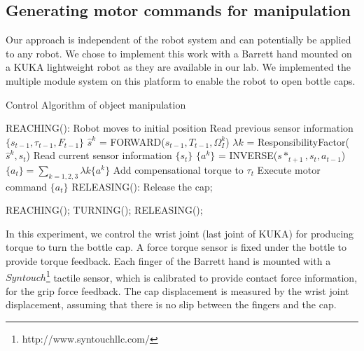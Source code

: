 \subsection{Generating motor commands for manipulation}
\label{cha4:sec3:command}
Our approach is independent of the robot system and can potentially be applied to any robot. We chose to implement this work with a Barrett hand mounted on a KUKA lightweight robot as they are available in our lab. We implemented the multiple module system on this platform to enable the robot to open bottle caps.

\begin{algorithm}[ht!]
  \caption{Control Algorithm of object manipulation}
  \begin{algorithmic}[1]
    \State REACHING(): Robot moves to initial position\;
          \State Read previous sensor information $\{s_{t-1},\tau_{t-1},F_{t-1}\}$\;
            \State $\hat{s}^{k}$ = FORWARD($s_{t-1},T_{t-1},\Omega_I^k$) \;
          \EndFor
            \State $\lambda{k}$ = ResponsibilityFactor($\hat{s}^{k},s_t$) \;
          \EndFor
          \State Read current sensor information $\{s_{t}\}$\;
            \State $\{a^k\}$ = INVERSE($s*_{t+1},s_t,a_{t-1}$) \;
          \EndFor
          \State $\{a_t\} = \sum_{k=1,2,3}\lambda{k}\{a^k\}$\;\;
          \State Add compensational torque to $\tau_t$\;
          \State Execute motor command $\{a_t\}$ \;
          \State RELEASING(): Release the cap;
        \EndFunction
    \EndFor

        \State REACHING();
        \State TURNING();
        \State RELEASING();
    \EndWhile

  \end{algorithmic}
  \label{code:control}
\end{algorithm}


In this experiment, we control the wrist joint (last joint of KUKA) for producing torque to turn the bottle cap. A force torque sensor is fixed under the bottle to provide torque feedback. Each finger of the Barrett hand is mounted with a $Syntouch$\footnote{http://www.syntouchllc.com/} tactile sensor, which is calibrated to provide contact force information, for the grip force feedback. The cap displacement is measured by the wrist joint displacement, assuming that there is no slip between the fingers and the cap.

